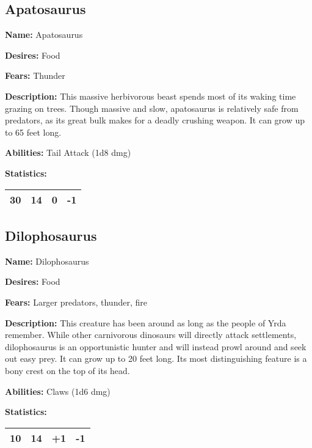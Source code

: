 \begin{multicols}{2}
\subsection{Apatosaurus}

\textbf{Name:} Apatosaurus

\textbf{Desires:} Food

\textbf{Fears:} Thunder

\textbf{Description:} This massive herbivorous beast spends most of its waking time grazing on trees.
Though massive and slow, apatosaurus is relatively safe from predators, as its great bulk makes for a
deadly crushing weapon. It can grow up to 65 feet long.

\textbf{Abilities:} Tail Attack (1d8 dmg)

\textbf{Statistics:}

\begin{center}
{
\begin{xtabular}{|l|l|l|l|}
30 & 14 & 0 & -1 \\
\hline
\end{xtabular}
}
\end{center}

\subsection{Dilophosaurus}

\textbf{Name:} Dilophosaurus

\textbf{Desires:} Food

\textbf{Fears:} Larger predators, thunder, fire

\textbf{Description:} This creature has been around as long as the people of Yrda remember.
While other carnivorous dinosaurs will directly attack settlements, dilophosaurus is an
opportunistic hunter and will instead prowl around and seek out easy prey. It can grow up
to 20 feet long. Its most distinguishing feature is a bony crest on the top of its head.

\textbf{Abilities:} Claws (1d6 dmg)

\textbf{Statistics:}

\begin{center}
{
\begin{xtabular}{|l|l|l|l|}
10 & 14 & +1 & -1 \\
\hline
\end{xtabular}
}
\end{center}


\end{multicols}
